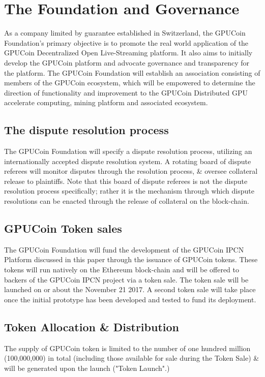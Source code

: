 \documentclass{article}
\begin{document}
\section{The Foundation and Governance} %
\label{sec:the_foundation_and_governance}
As a company limited by guarantee established in Switzerland, the GPUCoin Foundation's primary objective is to promote the real world application of the GPUCoin Decentralized Open Live-Streaming platform. It also aims to initially develop the GPUCoin platform and advocate governance and transparency for the platform. The GPUCoin Foundation will establish an association consisting of members of the GPUCoin ecosystem, which will be empowered to determine the direction of functionality and improvement to the GPUCoin Distributed GPU accelerate computing, mining platform and associated ecosystem.

\subsection{The dispute resolution process} %
\label{sub:the_dispute_resolution_process}
The GPUCoin Foundation will specify a dispute resolution process, utilizing an internationally accepted dispute resolution system. A rotating board of dispute referees will monitor disputes through the resolution process, \& oversee collateral release to plaintiffs. Note that this board of dispute referees is not the dispute resolution process specifically; rather it is the mechanism through which dispute resolutions can be enacted through the release of collateral on the block-chain.


\subsection{GPUCoin Token sales} %
\label{sub:hoot_token_sales}
The GPUCoin Foundation will fund the development of the GPUCoin IPCN Platform discussed in this paper through the issuance of GPUCoin tokens. These tokens will run natively on the Ethereum block-chain and will be offered to backers of the GPUCoin IPCN project via a token sale. The token sale will be launched on or about the November 21 2017. A second token sale will take place once the initial prototype has been developed and tested to fund its deployment. 

\subsection{Token Allocation \& Distribution} %
\label{sub:token_allocation_and_distribution}
 The supply of GPUCoin token is limited to the number of one hundred million (100,000,000) in total (including those available for sale during the Token Sale) \& will be generated upon the launch ("Token Launch".)
\end{document}
